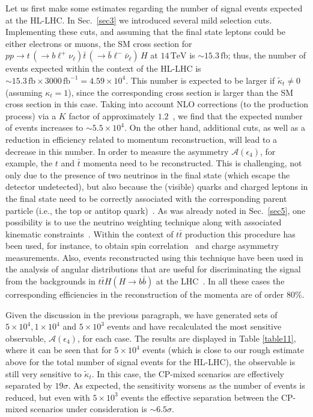 \documentclass[aps,preprint,tightenlines,floatfix,superscriptaddress,nofootinbib,showpacs]{revtex4-1}
\def\tbar{\bar{t}}
\def\bbar{\bar{b}}
\def\nubar{{\bar{\nu}}_{\ell}}
\def\ppprocess{pp\to t\,\left(\rightarrow b {\ell}^+ \nu_{\ell}\right) \tbar\,\left(\rightarrow\bbar {\ell}^-\nubar\right)\,H}
\def\kp{\kappa_t}
\def\kpt{\tilde{\kappa}_t}
\providecommand{\DIFadd}[1]{{\protect\color{blue}\uwave{#1}}} %
\providecommand{\DIFaddbegin}{} %
\providecommand{\DIFaddend}{} %
\begin{document}
Let us first make some estimates regarding the number of signal events
expected at the HL-LHC.
In Sec.~\ref{sec3} we introduced several mild selection cuts.
Implementing these cuts, and assuming that the final state leptons
could be either electrons or muons, the SM cross section for $\ppprocess$ at
$14\,\mathrm{TeV}$ is $\sim 15.3\,\mathrm{fb}$; thus, the number of
events expected within the context of the HL-LHC is $\sim
15.3\,\mathrm{fb} \times 3000\,\mathrm{fb}^{-1} = 4.59\times
10^4$. This number is expected to be larger
if $\kpt\neq 0$ (assuming $\kp=1$),
since the corresponding cross section is
larger than the SM cross section in this case.
Taking into account NLO corrections (to the
production process) via a $K$ factor of approximately
$1.2$~\cite{Dawson,Beenakker,Dittmaier}, we find that
the expected number of
events increases to $\sim 5.5 \times 10^4$.
On the other hand, additional cuts, as
well as a reduction in efficiency related to momentum reconstruction,
will lead to a decrease in this number.  In
order to measure the asymmetry $\mathcal{A}(\epsilon_4)$,
for example, the $t$ and $\tbar$
momenta need to be reconstructed. This is challenging, not only due to
the presence of two neutrinos in the final state (which escape the
detector undetected), but also because the (visible) quarks and charged leptons in the final
state need to be correctly associated with the corresponding
parent particle (i.e., the top or antitop quark)~\cite{atlasconf}.
As was
already noted in Sec.~\ref{sec5}, one possibility is to use the
neutrino weighting technique along with associated kinematic constraints~\cite{atlasconf,atlascharge,dosSantos}.
Within the context of $t\tbar$ production this
procedure has been used, for instance, to obtain 
spin correlation~\cite{atlasconf} and charge
asymmetry~\cite{atlascharge} measurements.
Also, events reconstructed using this technique have
been used in the analysis of angular distributions that
are useful for discriminating the signal from the backgrounds in
$t\tbar H (H\rightarrow b\bbar)$ at the LHC~\cite{dosSantos}.
 In all \DIFaddbegin \DIFadd{of }\DIFaddend these cases the corresponding
efficiencies in the reconstruction of the momenta are of order $80\%$.

Given the discussion in the previous paragraph, we
have generated sets of $5\times 10^4, 1\times 10^4$ and $5\times 10^3$
events and have recalculated the most sensitive observable, 
$\mathcal{A}(\epsilon_4)$, for each case. The results are displayed in
Table \ref{table11}, where it can be seen that for $5\times 10^4$ events
(which is close to our rough estimate above for the
total number of signal events for the
HL-LHC), 
the observable is still very sensitive to $\kpt$.
In this case, the $\mathrm{CP}$-mixed scenarios are
effectively separated by $19\sigma$. As expected, the
sensitivity worsens as the number of events is reduced, but even with
$5\times 10^3$ events the effective separation between the $\mathrm{CP}$-mixed
scenarios under consideration is $\sim 6.5\sigma$. \par
\end{document}
